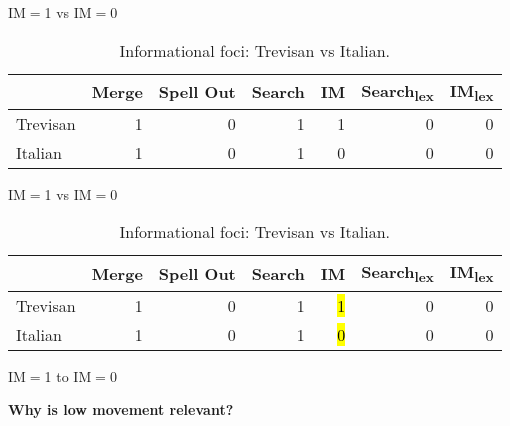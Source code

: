 \documentclass[lesson_slides]{subfiles}
\begin{document}
\begin{frame}[c]{IM$=$1 vs IM$=$0}

\begin{table}[ht]
    \centering
    \begin{tabular}{|l|r|r|r|r|r|r|}
    \hline
     & Merge & Spell Out & Search & IM & Search\textsubscript{lex} & IM\textsubscript{lex} \\
    \hline
    Trevisan & 1 & 0 & 1 & 1 & 0 & 0\\
    \hline
    Italian & 1 & 0 & 1 & 0 & 0 & 0 \\
    \hline
    \end{tabular}
    \caption{\label{tab:samp2}Informational foci: Trevisan vs Italian.}
    \end{table}

\end{frame}
\begin{frame}[c]{IM$=$1 vs IM$=$0}

\begin{table}[ht]
    \centering
    \begin{tabular}{|l|r|r|r|r|r|r|}
    \hline
     & Merge & Spell Out & Search & IM & Search\textsubscript{lex} & IM\textsubscript{lex} \\
    \hline
    Trevisan & 1 & 0 & 1 & \hl{1} & 0 & 0\\
    \hline
    Italian & 1 & 0 & 1 & \hl{0} & 0 & 0 \\
    \hline
    \end{tabular}
    \caption{\label{tab:samp2}Informational foci: Trevisan vs Italian.}
    \end{table}

\end{frame}
\begin{frame}{IM$=$1 to IM$=$0}

\begin{center}
    \textbf{Why is low movement relevant?}
\end{center}
    
\end{frame}
\end{document}
